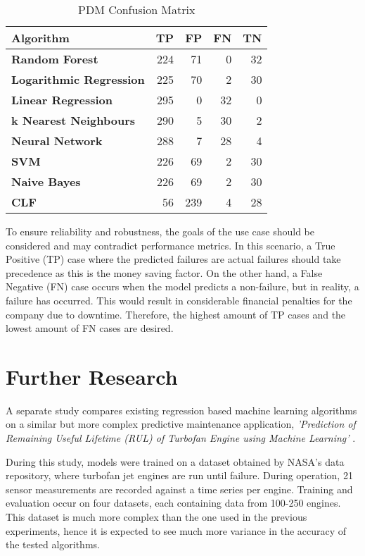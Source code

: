 \begin{table}[H]    
    \centering
    \caption{PDM Confusion Matrix}
    \label{table:Conf}
    \begin{tabular}{lrrrr}
        \toprule
        \textbf{Algorithm} &   \textbf{TP} &   \textbf{FP} &  \textbf{FN} &  \textbf{TN} \\
        \midrule
        \textbf{Random Forest} &  224 &   71 &   0 &  32 \\
        \textbf{Logarithmic Regression} &  225 &   70 &   2 &  30 \\
        \textbf{Linear Regression} &  295 &    0 &  32 &   0 \\
        \textbf{k Nearest Neighbours} &  290 &    5 &  30 &   2 \\
        \textbf{Neural Network} &  288 &    7 &  28 &   4 \\
        \textbf{SVM} &  226 &   69 &   2 &  30 \\
        \textbf{Naive Bayes} &  226 &   69 &   2 &  30 \\
        \textbf{CLF} &   56 &  239 &   4 &  28 \\
        \bottomrule
    \end{tabular}
\end{table}


To ensure reliability and robustness, the goals of the use case should be considered and may contradict performance metrics.
In this scenario, a True Positive (TP) case where the predicted failures are actual failures should take precedence as this is the money saving factor. 
On the other hand, a False Negative (FN) case occurs when the model predicts a non-failure, but in reality, a failure has occurred. 
This would result in considerable financial penalties for the company due to downtime.
Therefore, the highest amount of TP cases and the lowest amount of FN cases are desired.

\section{Further Research}

A separate study compares existing regression based machine learning algorithms on a similar but more complex predictive maintenance application,
\textit{'Prediction of Remaining Useful Lifetime (RUL) of Turbofan Engine using Machine Learning'} \cite{RUL}.

During this study, models were trained on a dataset obtained by NASA's data repository, where turbofan jet engines are run until failure.
During operation, 21 sensor measurements are recorded against a time series per engine. 
Training and evaluation occur on four datasets, each containing data from 100-250 engines. 
This dataset is much more complex than the one used in the previous experiments,
hence it is expected to see much more variance in the accuracy of the tested algorithms. 


